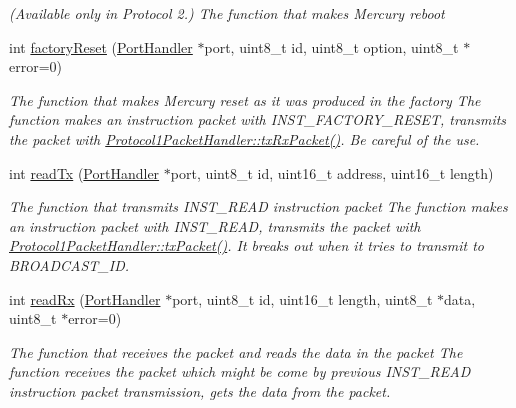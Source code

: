 \begin{DoxyCompactItemize}
\begin{DoxyCompactList}\small\item\em (Available only in Protocol 2.) The function that makes Mercury reboot \end{DoxyCompactList}\item 
int \hyperlink{classmercury_1_1_protocol1_packet_handler_abe10e5ccf088cbe7dba363dc03575d01}{factory\+Reset} (\hyperlink{classmercury_1_1_port_handler}{Port\+Handler} $\ast$port, uint8\+\_\+t id, uint8\+\_\+t option, uint8\+\_\+t $\ast$error=0)
\begin{DoxyCompactList}\small\item\em The function that makes Mercury reset as it was produced in the factory  The function makes an instruction packet with I\+N\+S\+T\+\_\+\+F\+A\+C\+T\+O\+R\+Y\+\_\+\+R\+E\+S\+ET,  transmits the packet with \hyperlink{classmercury_1_1_protocol1_packet_handler_ae488c4554064d6dd0ccabb9d2410e8f0}{Protocol1\+Packet\+Handler\+::tx\+Rx\+Packet()}.  Be careful of the use. \end{DoxyCompactList}\item 
int \hyperlink{classmercury_1_1_protocol1_packet_handler_a06f83e8acee5de4f733cc26a865602c3}{read\+Tx} (\hyperlink{classmercury_1_1_port_handler}{Port\+Handler} $\ast$port, uint8\+\_\+t id, uint16\+\_\+t address, uint16\+\_\+t length)
\begin{DoxyCompactList}\small\item\em The function that transmits I\+N\+S\+T\+\_\+\+R\+E\+AD instruction packet  The function makes an instruction packet with I\+N\+S\+T\+\_\+\+R\+E\+AD,  transmits the packet with \hyperlink{classmercury_1_1_protocol1_packet_handler_a232c9159fef54e7aaf38859fcce5a322}{Protocol1\+Packet\+Handler\+::tx\+Packet()}.  It breaks out  when it tries to transmit to B\+R\+O\+A\+D\+C\+A\+S\+T\+\_\+\+ID. \end{DoxyCompactList}\item 
int \hyperlink{classmercury_1_1_protocol1_packet_handler_a341885c5f9539e30f03946ea17884d02}{read\+Rx} (\hyperlink{classmercury_1_1_port_handler}{Port\+Handler} $\ast$port, uint8\+\_\+t id, uint16\+\_\+t length, uint8\+\_\+t $\ast$data, uint8\+\_\+t $\ast$error=0)
\begin{DoxyCompactList}\small\item\em The function that receives the packet and reads the data in the packet  The function receives the packet which might be come by previous I\+N\+S\+T\+\_\+\+R\+E\+AD instruction packet transmission,  gets the data from the packet. \end{DoxyCompactList}\item 

\end{DoxyCompactItemize}

